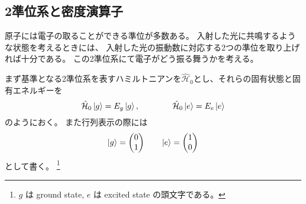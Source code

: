 \documentclass[11pt,dvipdfmx,a4paper]{jsarticle}
\begin{document}
\subsection{2準位系と密度演算子}
原子には電子の取ることができる準位が多数ある。
入射した光に共鳴するような状態を考えるときには、
入射した光の振動数に対応する2つの準位を取り上げれば十分である。
この2準位系にて電子がどう振る舞うかを考える。

まず基準となる2準位系を表すハミルトニアンを\(\hat{\mathcal{H}}_0\)とし、それらの固有状態と固有エネルギーを
\begin{equation}
	\hat{\mathcal{H}}_0 \ket{g} = E_g \ket{g}, \qquad \qquad \hat{\mathcal{H}}_0 \ket{e} = E_e \ket{e}
\end{equation}
のようにおく。
また行列表示の際には
\begin{equation}
	\ket{g} =
	\begin{pmatrix}
		0\\
		1
	\end{pmatrix}
	\qquad
	\ket{e} =
	\begin{pmatrix}
		1 \\
		0
	\end{pmatrix}
\end{equation}
として書く。
\footnote{\(g\) は ground state, \(e\) は excited state の頭文字である。}
\end{document}
